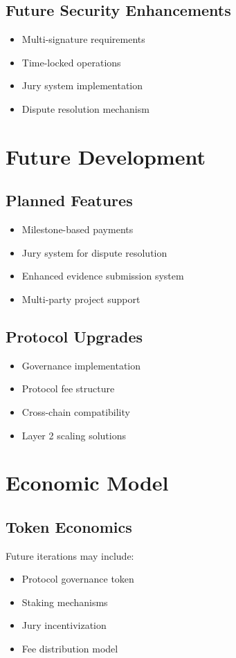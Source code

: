 \documentclass[12pt]{article}
\begin{document}
\subsection{Future Security Enhancements}
\begin{itemize}
    \item Multi-signature requirements
    \item Time-locked operations
    \item Jury system implementation
    \item Dispute resolution mechanism
\end{itemize}

\section{Future Development}
\subsection{Planned Features}
\begin{itemize}
    \item Milestone-based payments
    \item Jury system for dispute resolution
    \item Enhanced evidence submission system
    \item Multi-party project support
\end{itemize}

\subsection{Protocol Upgrades}
\begin{itemize}
    \item Governance implementation
    \item Protocol fee structure
    \item Cross-chain compatibility
    \item Layer 2 scaling solutions
\end{itemize}

\section{Economic Model}
\subsection{Token Economics}
Future iterations may include:
\begin{itemize}
    \item Protocol governance token
    \item Staking mechanisms
    \item Jury incentivization
    \item Fee distribution model
\end{itemize}
\end{document}
